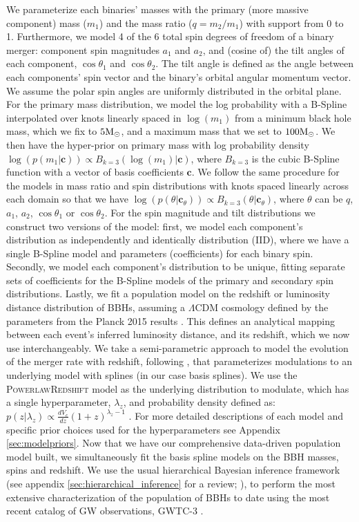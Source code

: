 We parameterize each binaries' masses with the primary (more massive component) mass ($m_1$) 
and the mass ratio ($q=m_2/m_1$) with support from 0 to 1. Furthermore, we model 4 of the 6 total 
spin degrees of freedom of a binary merger: component spin magnitudes $a_1$ and $a_2$, and (cosine of) the tilt angles of each component, $\cos{\theta_1}$ and $\cos{\theta_2}$. The tilt angle is defined as the angle between each components' spin vector and the binary's orbital angular momentum vector. 
We assume the polar spin angles are uniformly distributed in the orbital plane. For the primary mass distribution, we model the log probability with a B-Spline interpolated over 
knots linearly spaced in $\log(m_1)$ from a minimum black hole mass, which we fix to $5{\rm M}_\odot$, and a maximum mass 
that we set to $100{\rm M}_\odot$. We then have the hyper-prior on primary mass with log probability density 
$\log(p(m_1 | \bm{c})) \propto B_{k=3}(\log(m_1) | \bm{c})$, where $B_{k=3}$ is the 
cubic B-Spline function with a vector of basis coefficients $\bm{c}$. We follow the same procedure 
for the models in mass ratio and spin distributions with knots spaced linearly across each domain 
so that we have $\log(p(\theta | \bm{c}_\theta)) \propto B_{k=3}(\theta | \bm{c}_\theta)$, 
where $\theta$ can be $q$, $a_1$, $a_2$, $\cos{\theta_1}$ or $\cos{\theta_2}$. 
For the spin magnitude and tilt distributions we construct two versions of the model: first, we model  
each component's distribution as independently and identically distribution (IID), 
where we have a single B-Spline model and parameters (coefficients) for each binary spin. 
Secondly, we model each component's distribution to be unique, fitting separate sets of coefficients for the B-Spline models of the primary and secondary spin distributions. 
Lastly, we fit a population model on the redshift or luminosity distance distribution of BBHs, assuming a $\Lambda\mathrm{CDM}$ cosmology defined by the parameters 
from the Planck 2015 results \citep{Planck2015}. This defines an analytical mapping between each event's inferred luminosity distance, and its redshift, which we now use interchangeably. 
We take a semi-parametric approach to model the evolution of the merger rate with redshift, following \citet{Edelman_2022ApJ}, that parameterizes modulations to an underlying model 
with splines (in our case basis splines). We use the \textsc{PowerlawRedshift} model as the underlying distribution to modulate, which has a single hyperparameter, $\lambda_z$, and 
probability density defined as: $p(z|\lambda_z)\propto \frac{dV_c}{dz}(1+z)^{\lambda_z-1}$ \citep{Fishbach_2018redshift}. For more detailed descriptions of each model and 
specific prior choices used for the hyperparameters see Appendix \ref{sec:modelpriors}. Now that we have our comprehensive data-driven population model built, we simultaneously fit the basis spline models on the BBH masses, spins and redshift. We use the usual hierarchical Bayesian inference framework (see appendix \ref{sec:hierarchical_inference} for a review; \citet{o1o2_pop,o3a_pop,o3b_astro_dist}), to perform the most 
extensive characterization of the population of BBHs to date using the most recent catalog of GW observations, GWTC-3 \citep{GWTC3}.